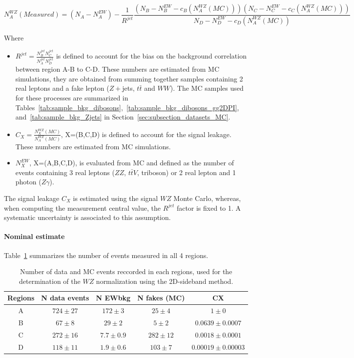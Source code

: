 \begin{equation}
N_A^{WZ}(Measured)=(N_A-N_A^{EW})-\frac{1}{R^{jet}} \frac{(N_B-N_B^{EW}-c_B (N_A^{WZ}(MC))) (N_C-N_C^{EW}-c_C (N_A^{WZ}(MC)))}{N_D-N_D^{EW}-c_D (N_A^{WZ}(MC))}
\label{Equ:NWjet1}
\end{equation}

Where 
\begin{itemize}
\item $R^{jet}=\frac{N^{jet}_B N^{jet}_C}{N^{jet}_A
  N^{jet}_D}$ is defined to account for the bias on the background correlation between region A-B to C-D. These numbers are estimated from MC simulations, they are obtained from summing together samples containing 2 real leptons and a fake lepton ($Z+$jets, $t\bar{t}$ and $WW$). The MC samples used for these processes are summarized in Tables~\ref{tab:sample_bkg_dibosons},~\ref{tab:sample_bkg_dibosons_gg2DPI}, and~\ref{tab:sample_bkg_Zjets} in Section~\ref{sec:subsection_datasets_MC}.
\item $C_X=\frac{N_X^{WZ}(MC)}{N_A^{WZ}(MC)}$, X=(B,C,D) is defined to account for the signal leakage. These numbers are estimated from MC simulations.
\item $N_X^{EW}$, X=(A,B,C,D), is evaluated from MC and defined as the number of events containing 3 real leptons ($ZZ$, $t\bar{t}V$, triboson) or 2 real lepton and 1 photon ($Z\gamma$).
\end{itemize}
The signal leakage $C_X$ is estimated using the signal $WZ$ Monte Carlo, whereas, when computing the measurement central value, the $R^{jet}$ factor is fixed to 1. A systematic uncertainty is associated to this assumption. 

\paragraph{Nominal estimate}


Table~\ref{tab:WZ_Nominal_Numbers} summarizes the number of events measured in all 4 regions.

\begin{table}[htp]
\centering
\begin{tabular}{c|cccc}
  \hline
  Regions & N data events & N EWbkg      & N fakes (MC)    & CX \\
  \hline
	    A & $724 \pm 27$ & $172 \pm 3$   & $25 \pm 4$ & $1 \pm 0$ \\ 
	    B & $67 \pm 8$   & $29 \pm  2$   & $5 \pm 2$ & $0.0639 \pm 0.0007$ \\ 
	    C & $272 \pm 16$ & $7.7 \pm 0.9$ & $282 \pm 12$ & $0.0018 \pm 0.0001$ \\ 
	    D & $118 \pm 11$ & $1.9 \pm 0.6$ & $103 \pm 7$ & $0.00019 \pm 0.00003$ \\ 
  \hline
\end{tabular}
\caption{Number of data and MC events reccorded in each regions, used for the determination of the $WZ$ normalization using the 2D-sideband method.}
\label{tab:WZ_Nominal_Numbers}
\end{table}

